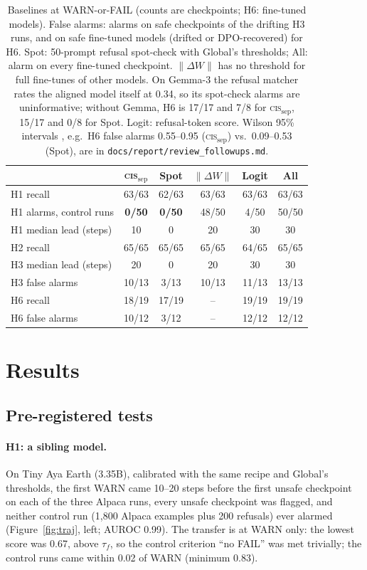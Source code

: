 \documentclass[11pt]{article}
\newcommand{\cissep}{\textsc{cis}$_{\text{sep}}$}
\newcommand{\dw}{$\lVert\Delta W\rVert$}
\begin{document}
\begin{table}[t]
\centering\small
\setlength{\tabcolsep}{2.2pt}
\begin{tabular}{@{}l c c c c c@{}}
\toprule
 & \cissep{} & Spot & \dw{} & Logit & All \\
\midrule
H1 recall & 63/63 & 62/63 & 63/63 & 63/63 & 63/63 \\
H1 alarms, control runs & \textbf{0/50} & \textbf{0/50} & 48/50 & 4/50 & 50/50 \\
H1 median lead (steps) & 10 & 0 & 20 & 30 & 30 \\
H2 recall & 65/65 & 65/65 & 65/65 & 64/65 & 65/65 \\
H3 median lead (steps) & 20 & 0 & 20 & 30 & 30 \\
H3 false alarms & 10/13 & 3/13 & 10/13 & 11/13 & 13/13 \\
H6 recall & 18/19 & 17/19 & -- & 19/19 & 19/19 \\
H6 false alarms & 10/12 & 3/12 & -- & 12/12 & 12/12 \\
\bottomrule
\end{tabular}
\caption{Baselines at WARN-or-FAIL (counts are checkpoints; H6: fine-tuned models). False alarms: alarms on safe
checkpoints of the drifting H3 runs, and on safe fine-tuned models (drifted or DPO-recovered) for H6. Spot: 50-prompt refusal spot-check with Global's thresholds; All: alarm on every fine-tuned checkpoint. \dw{} has
no threshold for full fine-tunes of other models. On Gemma-3 the refusal matcher rates the aligned model itself at
0.34, so its spot-check alarms are uninformative; without Gemma, H6 is 17/17 and 7/8 for \cissep{}, 15/17 and 0/8
for Spot. Logit: refusal-token score. Wilson 95\% intervals \citep{wilson1927probable}, e.g.\ H6 false alarms 0.55--0.95 (\cissep{}) vs.\ 0.09--0.53
(Spot), are in \texttt{docs/report/review\_followups.md}.}
\label{tab:baselines}
\end{table}

\section{Results}
\label{sec:results}

\subsection{Pre-registered tests}

\paragraph{H1: a sibling model.} On Tiny Aya Earth (3.35B), calibrated with the same recipe and Global's thresholds, the
first WARN came 10--20 steps before the first unsafe checkpoint on each of the three Alpaca runs, every unsafe checkpoint
was flagged, and neither control run (1{,}800 Alpaca examples plus 200 refusals) ever alarmed (Figure~\ref{fig:traj},
left; AUROC 0.99). The transfer is at WARN only: the lowest score was 0.67, above $\tau_f$, so the control criterion
``no FAIL'' was met trivially; the control runs came within 0.02 of WARN (minimum 0.83).
\end{document}
